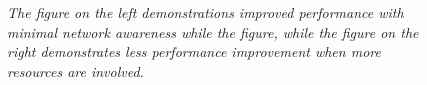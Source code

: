 \documentclass{rspublic}
\begin{document}
\begin{center}
\begin{figure}
\caption{\textit{The figure on the left demonstrations improved
performance with minimal network awareness while the figure, while the
figure on the right demonstrates less performance improvement when more
resources are involved.}}
\label{Fig:IntelligentExp}
\end{figure}
\end{center}
\end{document}
